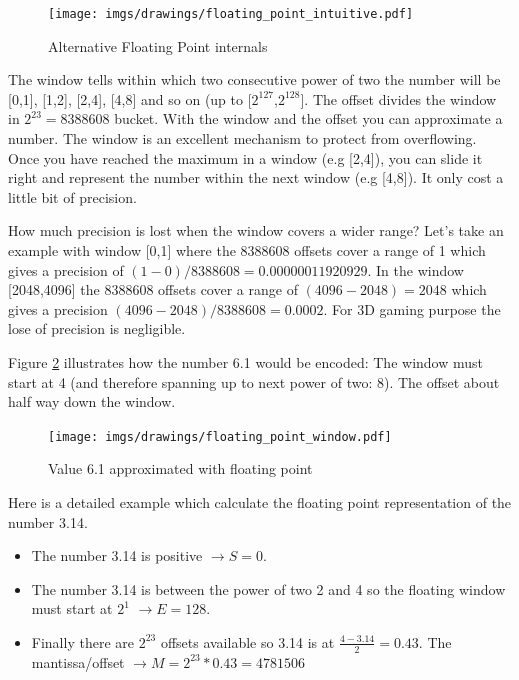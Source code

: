 \documentclass[book.tex]{subfiles}
\begin{document}
\begin{figure}[H]
\centering
\texttt{[image: imgs/drawings/floating\_point\_intuitive.pdf]}
\caption{Alternative Floating Point internals}
\label{fig:fp_internals}
\end{figure}
  \bigskip  
The window tells within which two consecutive power of two the number will be [0,1], [1,2], [2,4], [4,8] and so on (up to [$2^{127}$,$2^{128}$]. The offset divides the window in $ 2^{23} = 8388608 $  bucket. With the window and the offset you can approximate a number. The window is an excellent mechanism to protect from overflowing. Once you have reached the maximum in a window (e.g [2,4]), you can slide it right and represent the number within the next window (e.g [4,8]). It only cost a little bit of precision.\\


\par {} How much precision is lost when the window covers a wider range? Let's take an example with window [0,1] where the 8388608 offsets cover a range of 1 which gives a precision of $(1-0)/8388608=0.00000011920929$. In the window [2048,4096] the 8388608 offsets cover a range of $(4096-2048) = 2048$ which gives a precision $ (4096-2048)/8388608=0.0002$. For 3D gaming purpose the lose of precision is negligible.\\
\par

Figure \ref{fig:fp_internals_window6_1} illustrates how the number 6.1 would be encoded: The window must start at 4 (and therefore spanning up to next power of two: 8). The offset about half way down the window.

\begin{figure}[H]
\centering
\texttt{[image: imgs/drawings/floating\_point\_window.pdf]}

\caption{Value 6.1 approximated with floating point}
\label{fig:fp_internals_window6_1}
\end{figure}
  \bigskip
  
Here is a detailed example which calculate the floating point representation of the number 3.14.
\begin{itemize}
 \item The number 3.14 is positive  $\rightarrow S=0$.
 \item The number 3.14 is between the power of two 2 and 4 so the floating window must start at $2^1$  $\rightarrow E=128$.
 \item Finally there are $2^{23}$ offsets available so 3.14 is at $\frac{4-3.14}{2} = 0.43 $. The mantissa/offset $\rightarrow M = 2^{23}*0.43 = 4781506$
\end{itemize}
\end{document}
